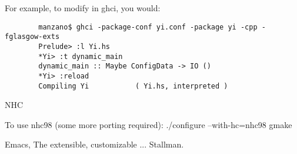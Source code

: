 For example, to modify  in ghci, you would:

\begin{verbatim}
        manzano$ ghci -package-conf yi.conf -package yi -cpp -fglasgow-exts
        Prelude> :l Yi.hs
        *Yi> :t dynamic_main
        dynamic_main :: Maybe ConfigData -> IO ()
        *Yi> :reload
        Compiling Yi           ( Yi.hs, interpreted )
\end{verbatim}

NHC

To use nhc98 (some more porting required):
    ./configure --with-hc=nhc98
    gmake

\begin{thebibliography}[50]
\bibitem Emacs, The extensible, customizable ... Stallman.
\end{thebibliography}
